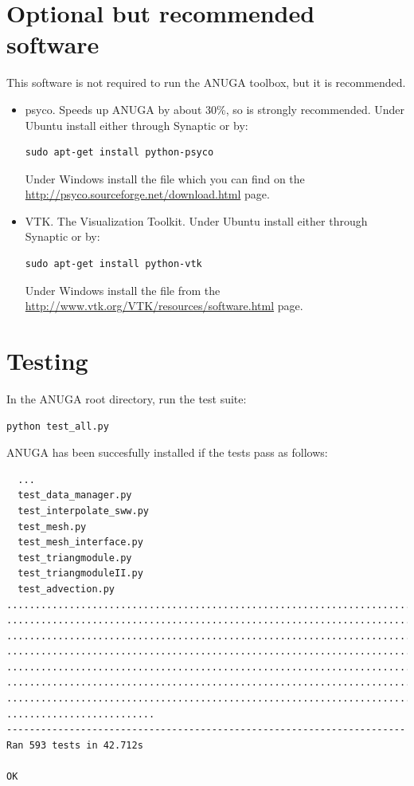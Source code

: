 \documentclass{manual}
\begin{document}
\section{Optional but recommended software}
This software is not required to run the ANUGA toolbox, but it is recommended.
\begin{itemize}
  \item psyco. Speeds up ANUGA by about 30\%, so is strongly recommended.
    Under Ubuntu install either through Synaptic or by:
    \begin{verbatim}sudo apt-get install python-psyco\end{verbatim}
    Under Windows install the file 
    which you can find on the \url{http://psyco.sourceforge.net/download.html} page.

  \item VTK. The Visualization Toolkit. Under Ubuntu install either through Synaptic or by:
    \begin{verbatim}sudo apt-get install python-vtk\end{verbatim}
    Under Windows install the file 
    from the \url{http://www.vtk.org/VTK/resources/software.html} page.
\end{itemize}



\section{Testing}

In the ANUGA root directory, run the test suite:
\begin{verbatim}
python test_all.py
\end{verbatim}
ANUGA has been succesfully installed if the tests pass as follows:
\begin{verbatim}
  ...
  test_data_manager.py
  test_interpolate_sww.py
  test_mesh.py
  test_mesh_interface.py
  test_triangmodule.py
  test_triangmoduleII.py
  test_advection.py
.................................................................................
.................................................................................
.................................................................................
.................................................................................
.................................................................................
.................................................................................
.................................................................................
..........................
----------------------------------------------------------------------
Ran 593 tests in 42.712s

OK
\end{verbatim}
\end{document}
